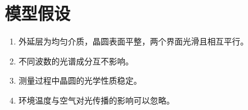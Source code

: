 \section{模型假设}

\begin{enumerate}
\item 外延层为均匀介质，晶圆表面平整，两个界面光滑且相互平行。
\item 不同波数的光谱成分互不影响。
\item 测量过程中晶圆的光学性质稳定。
\item 环境温度与空气对光传播的影响可以忽略。
\end{enumerate}
